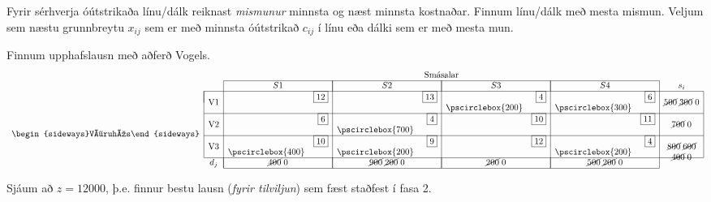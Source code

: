 \subsection{}
Fyrir sérhverja óútstrikaða línu/dálk reiknast \emph{mismunur} minnsta og næst minnsta kostnaðar. Finnum línu/dálk með mesta mismun. 
Veljum sem næstu grunnbreytu $x_{ij}$ sem er með minnsta óútstrikað $c_{ij}$ í línu eða dálki sem er með mesta mun. 

\begin{lausn} Finnum upphafslausn með aðferð Vogels. 
\[ \begin{array}{cccr|cr|cr|crcc}
 & & \multicolumn{8}{c}{\mbox{Smásalar}} \\ \cline{3-10}
 & & \multicolumn{2}{|c|}{S1} & \multicolumn{2}{|c|}{S2} & \multicolumn{2}{|c|}{S3}& \multicolumn{2}{|c|}{S4} & s_i \\ \cline{2-11}
\multicolumn{1}{c|}{\multirow{8}{*}{\begin{sideways}Vöruhús\end{sideways}}} 
& \multicolumn{1}{|c|}{\multirow{2}{*}{V1}} &   & \scriptscriptstyle{\fbox{12}}&    & \scriptscriptstyle{\fbox{13}} & & \scriptscriptstyle{\fbox{4}}& & \scriptscriptstyle{\fbox{6}} & \multicolumn{1}{|c|}{\multirow{2}{*}{\cancel{500}\;\cancel{300}\;0}}  \\ 
& \multicolumn{1}{|c|}{                  } &&&&& \pscirclebox{200} & & \pscirclebox{300}&    & \multicolumn{1}{|c|}{}\\ \cline{2-11}
& \multicolumn{1}{|c|}{\multirow{2}{*}{V2}} &   & \scriptscriptstyle{\fbox{6}}&    & \scriptscriptstyle{\fbox{4}} & & \scriptscriptstyle{\fbox{10}}& & \scriptscriptstyle{\fbox{11}} & \multicolumn{1}{|c|}{\multirow{2}{*}{\cancel{700}\;0}}  \\ 
& \multicolumn{1}{|c|}{                  } &  &    & \pscirclebox{700}&    & & &&   & \multicolumn{1}{|c|}{}\\ \cline{2-11}
& \multicolumn{1}{|c|}{\multirow{2}{*}{V3}} &   & \scriptscriptstyle{\fbox{10}}&    & \scriptscriptstyle{\fbox{9}} &  & \scriptscriptstyle{\fbox{12}} & & \scriptscriptstyle{\fbox{4}} & \multicolumn{1}{|c|}{\multirow{2}{*}{\cancel{800}\;\cancel{600}}} \\ 
& \multicolumn{1}{|c|}{                  } &   \pscirclebox{400}&    & \pscirclebox{200}&  && & \pscirclebox{200}& & \multicolumn{1}{|c|}{\multirow{2}{*}{\cancel{400}\;0}}\\ \cline{2-11}
&  \multicolumn{1}{c|}{d_j}& \multicolumn{2}{|c|}{\cancel{400}\;0} & \multicolumn{2}{|c|}{\cancel{900}\;\cancel{200}\;0} & \multicolumn{2}{|c|}{\cancel{200}\;0} &\multicolumn{2}{|c|}{\cancel{500}\;\cancel{200}\;0} & \\ \cline{3-10}
\end{array}
\]
\vspace{5cm}

Sjáum að $z=12000$, þ.e. finnur bestu lausn (\emph{fyrir tilviljun}) sem fæst staðfest í fasa 2.
\end{lausn}





